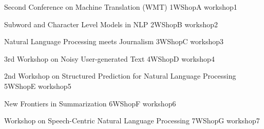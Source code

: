 \documentclass{book}
\begin{document}
\fancyfoot[C]{}

\begin{wsschedule}
  {Second Conference on Machine Translation (WMT)}
  {1}{WShopA}
  {workshop1}
  {\WShopLocA}
  
\end{wsschedule}
        


\begin{wsschedule}
  {Subword and Character Level Models in NLP}
  {2}{WShopB}
  {workshop2}
  {\WShopLocB}
  
\end{wsschedule}

\begin{wsschedule}
  {Natural Language Processing meets Journalism}
  {3}{WShopC}
  {workshop3}
  {\WShopLocC}
  
\end{wsschedule}

\begin{wsschedule}
  {3rd Workshop on Noisy User-generated Text}
  {4}{WShopD}
  {workshop4}
  {\WShopLocD}
  
\end{wsschedule}

\begin{wsschedule}
  {2nd Workshop on Structured Prediction for Natural Language Processing}
  {5}{WShopE}
  {workshop5}
  {\WShopLocE}
  
\end{wsschedule}

\begin{wsschedule}
  {New Frontiers in Summarization}
  {6}{WShopF}
  {workshop6}
  {\WShopLocF}
  
\end{wsschedule}

\begin{wsschedule}
  {Workshop on Speech-Centric Natural Language Processing}
  {7}{WShopG}
  {workshop7}
  {\WShopLocG}
  
\end{wsschedule}
%
%  


\end{document}
